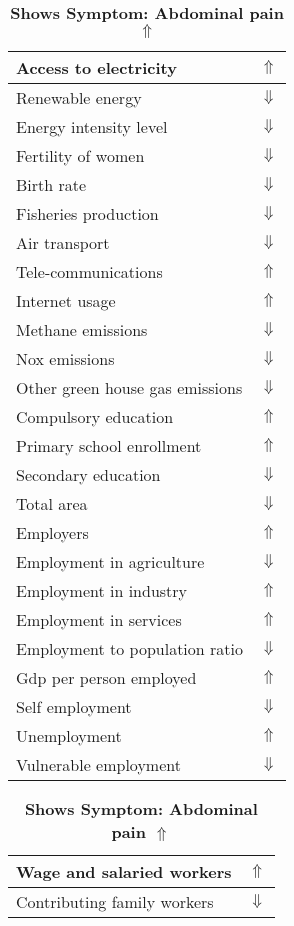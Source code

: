 \documentclass[12pt,notitlepage,oneside]{report}
\begin{document}
\clearpage
\begin{table}[!htb]
\caption{\textbf{Shows Symptom: Abdominal pain $\Uparrow$}}
\centering
\label{Correlated Socio-economic Factors0}
\begin{tabular}{|l|l|}
\hline
Access to electricity & $\Uparrow$\\ \hline
Renewable energy & $\Downarrow$\\ \hline
Energy intensity level & $\Downarrow$\\ \hline
Fertility of women & $\Downarrow$\\ \hline
Birth rate & $\Downarrow$\\ \hline
Fisheries production & $\Downarrow$\\ \hline
Air transport  & $\Downarrow$\\ \hline
Tele-communications & $\Uparrow$\\ \hline
Internet usage & $\Uparrow$\\ \hline
Methane emissions & $\Downarrow$\\ \hline
Nox emissions & $\Downarrow$\\ \hline
Other green house gas emissions & $\Downarrow$\\ \hline
Compulsory education & $\Uparrow$\\ \hline
Primary school enrollment & $\Uparrow$\\ \hline
Secondary education & $\Downarrow$\\ \hline
Total area & $\Downarrow$\\ \hline
Employers & $\Uparrow$\\ \hline
Employment in agriculture & $\Downarrow$\\ \hline
Employment in industry & $\Uparrow$\\ \hline
Employment in services & $\Uparrow$\\ \hline
Employment to population ratio & $\Downarrow$\\ \hline
Gdp per person employed & $\Uparrow$\\ \hline
Self employment & $\Downarrow$\\ \hline
Unemployment & $\Uparrow$\\ \hline
Vulnerable employment & $\Downarrow$\\ \hline
\end{tabular}
\begin{tabular}{|l|l|}
\hline
Wage and salaried workers & $\Uparrow$\\ \hline
Contributing family workers & $\Downarrow$\\ \hline

\end{tabular}
\end{table}
\end{document}
